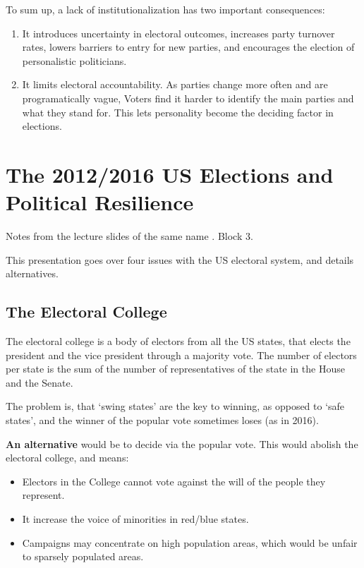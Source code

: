 
To sum up, a lack of institutionalization has two important
consequences:
\begin{enumerate}
  \item It introduces uncertainty in electoral outcomes, increases party
    turnover rates, lowers barriers to entry for new parties, and
    encourages the election of personalistic politicians.
  \item It limits electoral accountability. As parties change more
    often and are programatically vague, Voters find it harder to
    identify the main parties and what they stand for. This lets
    personality become the deciding factor in elections.
\end{enumerate}

\section{The 2012/2016 US Elections and Political Resilience}
\begin{flushright}
  \scriptsize Notes from the lecture slides of the same name . Block
  3.
\end{flushright}


This presentation goes over four issues with the US electoral system,
and details alternatives.

\subsection{The Electoral College}

The electoral college is a body of electors from all the US states,
that elects the president and the vice president through a majority
vote. The number of electors per state is the sum of the number of
representatives of the state in the House and the Senate.

The problem is, that `swing states' are the key to winning, as opposed
to `safe states', and the winner of the popular vote sometimes loses
(as in 2016).

\textbf{An alternative} would be to decide via the popular vote. This would
abolish the electoral college, and means:
\begin{itemize}
  \item Electors in the College cannot vote against the will of the
    people they represent.
  \item It increase the voice of minorities in red/blue states.
  \item Campaigns may concentrate on high population areas, which
    would be unfair to sparsely populated areas.
\end{itemize}

